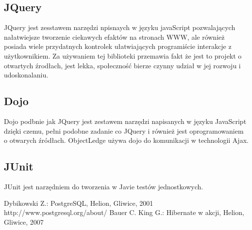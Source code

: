 \subsection{JQuery}
JQuery jest zesstawem narzędzi npisnaych w języku javaScript pozwalających nałatwiejsze tworzenie ciekawych
efaktów na stronach WWW, ale również posiada wiele przydatnych kontrolek ułatwiających programiście 
interakcje z użytkownikiem. Za używaniem tej biblioteki przemawia fakt że jest to projekt o otwartych źrodłach,
jest lekka, społeczność bierze czynny udział w jej rozwoju i udoskonalaniu.
\subsection{Dojo}
Dojo podbnie jak JQuery jest zestawem narzędzi napisanych w języku JavaScript dzięki czemu, pełni podobne 
zadanie co JQuery i również jest oprogramowaniem o otwarych źródłach. ObjectLedge używa dojo do komunikacji
w technologii Ajax.
\subsection{JUnit}
JUnit jest narzędniem do tworzenia w Javie testów jednostkowych.
\newpage
\begin{thebibliography}{szerokosc}
Dybikowski Z.: PostgreSQL, Helion, Gliwice, 2001
http://www.postgresql.org/about/
Bauer C. King G.: Hibernate w akcji, Helion, Gliwice, 2007
\end{thebibliography}